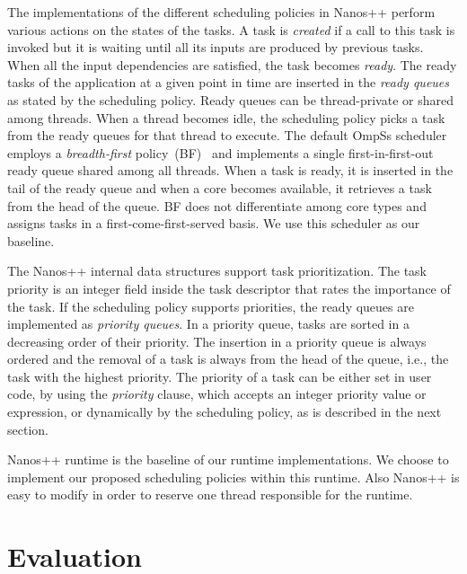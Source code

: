The implementations of the different scheduling policies in Nanos++ perform various actions on the states of the tasks. A task is \textit{created} if a call to this task is invoked but it is waiting until all its inputs are produced by previous tasks. When all the input dependencies are satisfied, the task becomes \textit{ready}. The ready tasks of the application at a given point in time are inserted in the \textit{ready queues} as stated by the scheduling policy. Ready queues can be thread-private or shared among threads. When a thread becomes idle, the scheduling policy picks a task from the ready queues for that thread to execute. The default OmpSs scheduler employs a \textit{breadth-first} policy~(BF)~\cite{Duran_schedulers_08} and implements a single first-in-first-out ready queue shared among all threads. When a task is ready, it is inserted in the tail of the ready queue and when a core becomes available, it retrieves a task from the head of the queue. BF does not differentiate among core types and assigns tasks in a first-come-first-served basis. We use this scheduler as our baseline.

The Nanos++ internal data structures support task prioritization. The task priority is an integer field inside the task descriptor that rates the importance of the task. If the scheduling policy supports priorities, the ready queues are implemented as \textit{priority queues}. In a priority queue, tasks are sorted in a decreasing order of their priority. The insertion in a priority queue is always ordered and the removal of a task is always from the head of the queue, i.e., the task with the highest priority. The priority of a task can be either set in user code, by using the \textit{priority} clause, which accepts an integer priority value or expression, or dynamically  by the scheduling policy, as is described in the next section.

Nanos++ runtime is the baseline of our runtime implementations.
We choose to implement our proposed scheduling policies within this runtime.
Also Nanos++ is easy to modify in order to reserve one thread responsible for the runtime.





\section{Evaluation}

